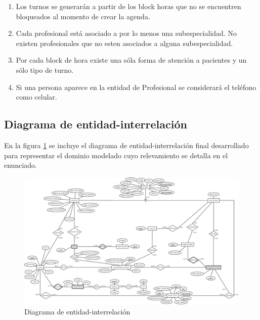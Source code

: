 \documentclass[a4paper,11pt]{article}
\begin{document}
\begin{enumerate}
    \item Los turnos se generarán a partir de los block horas que no se encuentren 
    bloqueados al momento de crear la agenda.
    
    \item Cada profesional está asociado a por lo menos una subespecialidad. No existen 
    profesionales que no esten asociados a alguna subespecialidad.
    
    \item Por cada block de hora existe una sóla forma de atención a pacientes y un 
    sólo tipo de turno.

    \item Si una persona aparece en la entidad de Profesional se considerará el teléfono
    como celular.

\end{enumerate}



\subsection{Diagrama de entidad-interrelación}

 En la figura \ref{fig:der} se incluye el diagrama de entidad-interrelación
 final desarrollado para representar el dominio modelado cuyo relevamiento se
 detalla en el enunciado.

\begin{figure}[h!t]
  \centering
  \includegraphics[width=1.4\textwidth, angle=90]{build/images/der.jpeg}
  \caption{Diagrama de entidad-interrelación} \label{fig:der}
\end{figure}

\FloatBarrier
\end{document}
